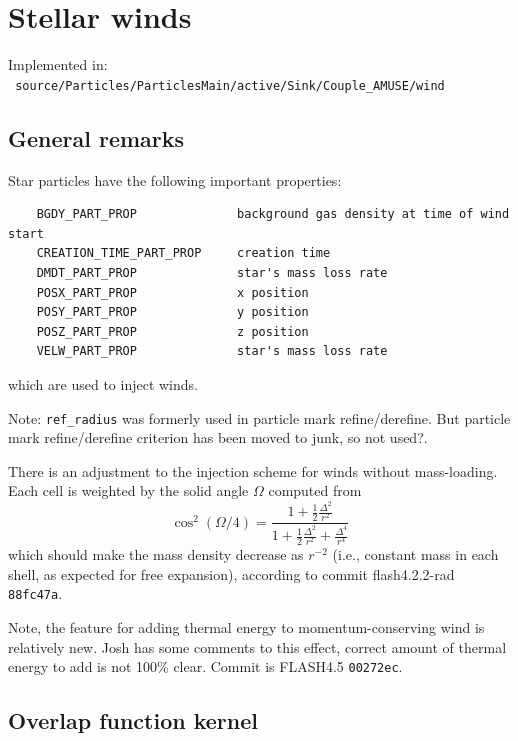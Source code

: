 \documentclass[10pt]{article}
\begin{document}
\section{Stellar winds}

Implemented in: \\
\texttt{
source/Particles/ParticlesMain/active/Sink/Couple\_AMUSE/wind
}

\subsection{General remarks}

Star particles have the following important properties:
\begin{verbatim}
    BGDY_PART_PROP              background gas density at time of wind start
    CREATION_TIME_PART_PROP     creation time
    DMDT_PART_PROP              star's mass loss rate
    POSX_PART_PROP              x position
    POSY_PART_PROP              y position
    POSZ_PART_PROP              z position
    VELW_PART_PROP              star's mass loss rate
\end{verbatim}
which are used to inject winds.

Note: \texttt{ref\_radius} was formerly used in particle mark refine/derefine.
But particle mark refine/derefine criterion has been moved to junk, so not used?.

There is an adjustment to the injection scheme for winds without mass-loading.
Each cell is weighted by the solid angle $\Omega$ computed from
\[
    \cos^2 \left(\Omega/4\right)
    = \frac {1 + \frac{1}{2} \frac{\Delta^2}{r^2}}
            {1 + \frac{1}{2} \frac{\Delta^2}{r^2} + \frac{\Delta^4}{r^4}}
\]
which should make the mass density decrease as $r^{-2}$ (i.e., constant mass in
each shell, as expected for free expansion), according to commit
flash4.2.2-rad \texttt{88fc47a}.

Note, the feature for adding thermal energy to momentum-conserving wind is
relatively new.  Josh has some comments to this effect,
correct amount of thermal energy to add is not 100\% clear.
Commit is FLASH4.5 \texttt{00272ec}.

\subsection{Overlap function kernel}
\end{document}
